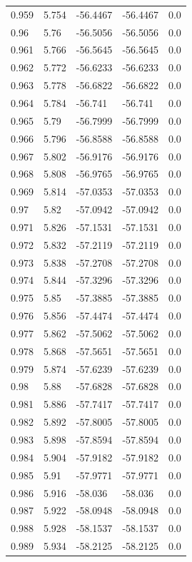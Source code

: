 \begin{table}[H]
\begin{tabular}{lllll}
0.959 & 5.754 & -56.4467 & -56.4467 & 0.0 \\
0.96 & 5.76 & -56.5056 & -56.5056 & 0.0 \\
0.961 & 5.766 & -56.5645 & -56.5645 & 0.0 \\
0.962 & 5.772 & -56.6233 & -56.6233 & 0.0 \\
0.963 & 5.778 & -56.6822 & -56.6822 & 0.0 \\
0.964 & 5.784 & -56.741 & -56.741 & 0.0 \\
0.965 & 5.79 & -56.7999 & -56.7999 & 0.0 \\
0.966 & 5.796 & -56.8588 & -56.8588 & 0.0 \\
0.967 & 5.802 & -56.9176 & -56.9176 & 0.0 \\
0.968 & 5.808 & -56.9765 & -56.9765 & 0.0 \\
0.969 & 5.814 & -57.0353 & -57.0353 & 0.0 \\
0.97 & 5.82 & -57.0942 & -57.0942 & 0.0 \\
0.971 & 5.826 & -57.1531 & -57.1531 & 0.0 \\
0.972 & 5.832 & -57.2119 & -57.2119 & 0.0 \\
0.973 & 5.838 & -57.2708 & -57.2708 & 0.0 \\
0.974 & 5.844 & -57.3296 & -57.3296 & 0.0 \\
0.975 & 5.85 & -57.3885 & -57.3885 & 0.0 \\
0.976 & 5.856 & -57.4474 & -57.4474 & 0.0 \\
0.977 & 5.862 & -57.5062 & -57.5062 & 0.0 \\
0.978 & 5.868 & -57.5651 & -57.5651 & 0.0 \\
0.979 & 5.874 & -57.6239 & -57.6239 & 0.0 \\
0.98 & 5.88 & -57.6828 & -57.6828 & 0.0 \\
0.981 & 5.886 & -57.7417 & -57.7417 & 0.0 \\
0.982 & 5.892 & -57.8005 & -57.8005 & 0.0 \\
0.983 & 5.898 & -57.8594 & -57.8594 & 0.0 \\
0.984 & 5.904 & -57.9182 & -57.9182 & 0.0 \\
0.985 & 5.91 & -57.9771 & -57.9771 & 0.0 \\
0.986 & 5.916 & -58.036 & -58.036 & 0.0 \\
0.987 & 5.922 & -58.0948 & -58.0948 & 0.0 \\
0.988 & 5.928 & -58.1537 & -58.1537 & 0.0 \\
0.989 & 5.934 & -58.2125 & -58.2125 & 0.0 \\

\end{tabular}
\end{table}
